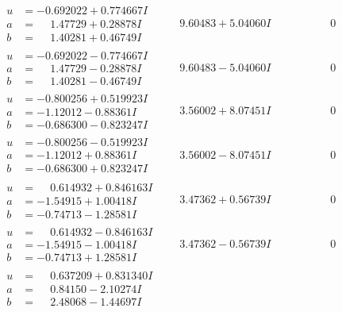 \documentclass[1p]{elsarticle_modified}
\theoremstyle{definition}
\begin{document}
$$\begin{array}{c|c|c}
\begin{aligned}
u &= -0.692022 + 0.774667 I \\
a &= \phantom{-}1.47729 + 0.28878 I \\
b &= \phantom{-}1.40281 + 0.46749 I\end{aligned}
 & \phantom{-}9.60483 + 5.04060 I & \phantom{-0.000000 } 0 \\ \hline\begin{aligned}
u &= -0.692022 - 0.774667 I \\
a &= \phantom{-}1.47729 - 0.28878 I \\
b &= \phantom{-}1.40281 - 0.46749 I\end{aligned}
 & \phantom{-}9.60483 - 5.04060 I & \phantom{-0.000000 } 0 \\ \hline\begin{aligned}
u &= -0.800256 + 0.519923 I \\
a &= -1.12012 - 0.88361 I \\
b &= -0.686300 - 0.823247 I\end{aligned}
 & \phantom{-}3.56002 + 8.07451 I & \phantom{-0.000000 } 0 \\ \hline\begin{aligned}
u &= -0.800256 - 0.519923 I \\
a &= -1.12012 + 0.88361 I \\
b &= -0.686300 + 0.823247 I\end{aligned}
 & \phantom{-}3.56002 - 8.07451 I & \phantom{-0.000000 } 0 \\ \hline\begin{aligned}
u &= \phantom{-}0.614932 + 0.846163 I \\
a &= -1.54915 + 1.00418 I \\
b &= -0.74713 - 1.28581 I\end{aligned}
 & \phantom{-}3.47362 + 0.56739 I & \phantom{-0.000000 } 0 \\ \hline\begin{aligned}
u &= \phantom{-}0.614932 - 0.846163 I \\
a &= -1.54915 - 1.00418 I \\
b &= -0.74713 + 1.28581 I\end{aligned}
 & \phantom{-}3.47362 - 0.56739 I & \phantom{-0.000000 } 0 \\ \hline\begin{aligned}
u &= \phantom{-}0.637209 + 0.831340 I \\
a &= \phantom{-}0.84150 - 2.10274 I \\
b &= \phantom{-}2.48068 - 1.44697 I\end{aligned}

\end{array}$$
\end{document}
